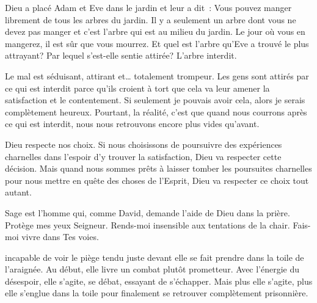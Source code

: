 Dieu a placé Adam et Eve dans le jardin et leur a dit~:
 \og Vous pouvez manger librement de tous les arbres du jardin.
 Il y a seulement un arbre dont vous ne devez pas manger et c'est l'arbre
 qui est au milieu du jardin. Le jour où vous en mangerez,
 il est sûr que vous mourrez. \fg{}
 Et quel est l'arbre qu'Eve a trouvé le plus attrayant?
 Par lequel s'est-elle sentie attirée? L'arbre interdit.

Le mal est séduisant, attirant et\dots{} totalement trompeur.
 Les gens sont attirés par ce qui est interdit parce qu'ils croient
 à tort que cela va leur amener la satisfaction et le contentement.
 \og Si seulement je pouvais avoir cela,
 alors je serais complètement heureux. \fg{}
 Pourtant, la réalité, c'est que quand nous courrons après ce qui est interdit,
 nous nous retrouvons encore plus vides qu'avant.


Dieu respecte nos choix. Si nous choisissons de poursuivre des expériences
 charnelles dans l'espoir d'y trouver la satisfaction,
 Dieu va respecter cette décision.
 Mais quand nous sommes prêts à laisser tomber les poursuites charnelles
 pour nous mettre en quête des choses de l'Esprit,
 Dieu va respecter ce choix tout autant.

Sage est l'homme qui, comme David, demande l'aide de Dieu dans la prière.
 \og Protège mes yeux Seigneur.
 Rends-moi insensible aux tentations de la chair.
 Fais-moi vivre dans Tes voies. \fg{}

\dvrule







 \ocadr incapable de voir le piège tendu juste devant elle \fcadr{}
 se fait prendre dans la toile de l'araignée.
 Au début, elle livre un combat plutôt prometteur.
 Avec l'énergie du désespoir, elle s'agite, se débat,
 essayant de s'échapper.
 Mais plus elle s'agite, plus elle s'englue dans la toile
 pour finalement se retrouver complètement prisonnière. 

